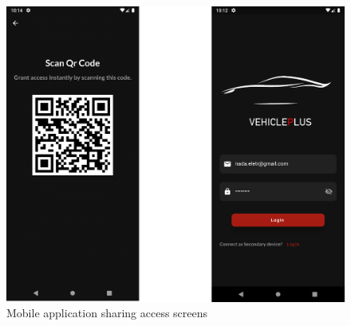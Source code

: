 \documentclass[
12pt,
oneside, 
onehalfspacing, 
nolistspacing, 
parskip, 
chapterinoneline, 
]{AASTCOMPUTER}
\begin{document}
\begin{figure}[!ht]
	\centering
	\includegraphics[scale=1]{Figures/mobileApp/2.png}
  	\caption{Mobile application sharing access screens}
  	\label{fig:Mobile application sharing access screens}
\end{figure}
\newpage
\end{document}

